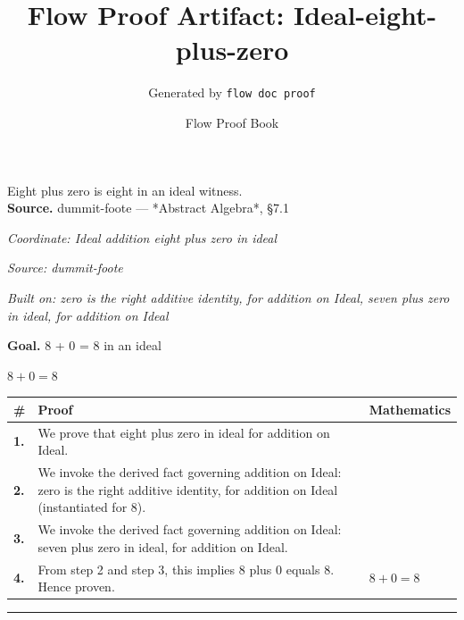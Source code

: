 \documentclass[11pt]{article}
\title{Flow Proof Artifact: Ideal-eight-plus-zero}
\author{Generated by \texttt{flow doc proof}}
\date{Flow Proof Book}
\theoremstyle{definition}
\begin{document}
\maketitle
Eight plus zero is eight in an ideal witness.\\[0.5em]
\textbf{Source.} dummit-foote — *Abstract Algebra*, §7.1\\[0.5em]
\bigskip
{}\par
\smallskip\noindent\textit{Coordinate: Ideal \cdot addition \cdot eight plus zero in ideal}\par
\smallskip\noindent\textit{Source: dummit-foote}\par
\smallskip\noindent\textit{Built on: zero is the right additive identity, for addition on Ideal, seven plus zero in ideal, for addition on Ideal}\par
\medskip
\noindent\textbf{Goal.} 8 + 0 = 8 in an ideal\par
\noindent$\displaystyle 8 + 0 = 8$\par
\medskip
\noindent
\begin{tabular}{@{} >{\raggedright\arraybackslash}p{} >{\raggedright\arraybackslash}p{} >{\raggedleft\arraybackslash}p{} @{}}
\textbf{\#} & \textbf{Proof} & \textbf{Mathematics} \\
\midrule
\textbf{1.} & We prove that eight plus zero in ideal for addition on Ideal. & \\[0.45em]
\textbf{2.} & We invoke the derived fact governing addition on Ideal: zero is the right additive identity, for addition on Ideal (instantiated for 8). & \\[0.45em]
\textbf{3.} & We invoke the derived fact governing addition on Ideal: seven plus zero in ideal, for addition on Ideal. & \\[0.45em]
\textbf{4.} & From step 2 and step 3, this implies 8 plus 0 equals 8. Hence proven. & $\displaystyle 8 + 0 = 8$ \\[0.45em]
\bottomrule
\end{tabular}
\label{thm:Ideal-addition-eight_plus_zero_in_ideal}
\par\medskip\hrule
\end{document}
